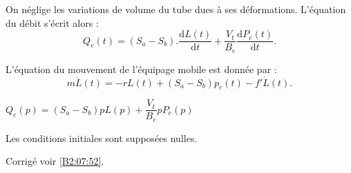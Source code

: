 On néglige les variations de volume du tube dues à ses déformations. L’équation du débit s’écrit alors :
	$$Q_e (t)=(S_a-S_b ).\dfrac{\text{d}L(t)}{\text{d}t}+\dfrac{V_t}{B_e}  \dfrac{\text{d}P_e (t)}{\text{d}t}.$$


L’équation du mouvement de l’équipage mobile est donnée par : 
$$
m\ddot{L}(t)=-rL(t)+\left(S_a-S_b \right)p_e(t)-f'\dot{L}(t).
$$

\fi
{}
\ifprof
\begin{corrige}
	$Q_e (p)=(S_a-S_b )p L(p)+\dfrac{V_t}{B_e}  p P_e(p)$
\end{corrige}
\else
\fi
Les conditions initiales sont supposées nulles.

\ifprof
\begin{corrige}
\end{corrige}
\else
\fi

\ifprof
\else
\begin{center}
\end{center}
\fi
 

\ifprof
\else
\begin{flushright}
\footnotesize{Corrigé  voir \ref{B2:07:52}.}
\end{flushright}%
\fi